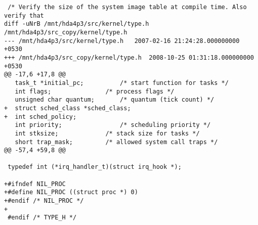 \begin{verbatim}
 /* Verify the size of the system image table at compile time. Also verify that 
diff -uNrB /mnt/hda4p3/src/kernel/type.h /mnt/hda4p3/src_copy/kernel/type.h
--- /mnt/hda4p3/src/kernel/type.h	2007-02-16 21:24:28.000000000 +0530
+++ /mnt/hda4p3/src_copy/kernel/type.h	2008-10-25 01:31:18.000000000 +0530
@@ -17,6 +17,8 @@
   task_t *initial_pc;			/* start function for tasks */
   int flags;				/* process flags */
   unsigned char quantum;		/* quantum (tick count) */
+  struct sched_class *sched_class;
+  int sched_policy;
   int priority;				/* scheduling priority */
   int stksize;				/* stack size for tasks */
   short trap_mask;			/* allowed system call traps */
@@ -57,4 +59,8 @@
 
 typedef int (*irq_handler_t)(struct irq_hook *);
 
+#ifndef NIL_PROC
+#define NIL_PROC ((struct proc *) 0)
+#endif /* NIL_PROC */
+
 #endif /* TYPE_H */
\end{verbatim}

